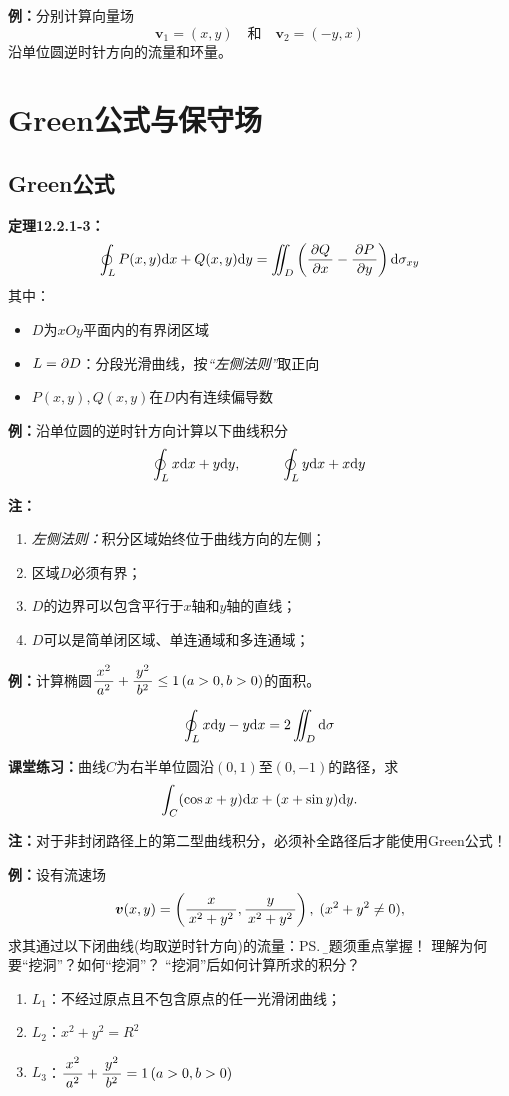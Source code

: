 {\bf 例：}分别计算向量场
$$\bm{v}_1=(x,y)\quad\mbox{和}\quad \bm{v}_2=(-y,x)$$
沿单位圆逆时针方向的流量和环量。

\section{Green公式与保守场}

\subsection{Green公式}

{\bf 定理12.2.1-3：}$$\oint_LP(x,y)\mathrm{d} x+Q(x,y)\mathrm{d} y=\iint_D\left(
\displaystyle\frac{\,{\partial Q}\,}{\,{\partial x}\,}-\displaystyle\frac{\,{\partial P}\,}{\,{\partial y}\,}\right)\mathrm{d}\sigma_{xy}$$
其中：
\begin{itemize}
  \setlength{\itemindent}{1cm}
  \item $D$为$xOy$平面内的有界闭区域
  \item $L=\partial D$：分段光滑曲线，按{\it “左侧法则”}取正向
  \item $P(x,y),Q(x,y)$在$D$内有连续偏导数
\end{itemize}

{\bf 例：}沿单位圆的逆时针方向计算以下曲线积分
$$\oint_Lx\mathrm{d} x+y\mathrm{d} y,\hspace{3em}\oint_Ly\mathrm{d} x+x\mathrm{d} y$$

{\bf 注：}
\begin{enumerate}[(1)]
  \setlength{\itemindent}{1cm}
  \item {\it 左侧法则：}积分区域始终位于曲线方向的左侧；
  \item 区域$D$必须有界；
  \item $D$的边界可以包含平行于$x$轴和$y$轴的直线；
  \item $D$可以是简单闭区域、单连通域和多连通域；
\end{enumerate}

{\bf 例：}计算椭圆$\displaystyle\frac{\,{x^2}\,}{\,{a^2}\,}+\displaystyle\frac{\,{y^2}\,}{\,{b^2}\,}\leq 1\,(a>0,b>0)$的面积。

$$\oint_L x\mathrm{d} y-y\mathrm{d} x=2\iint_D\mathrm{d}\sigma$$

{\bf 课堂练习：}曲线$C$为右半单位圆沿$(0,1)$至$(0,-1)$的路径，求
$$\int_C(\cos x+y)\mathrm{d} x+(x+\sin y)\mathrm{d} y.$$

{\bf 注：}对于非封闭路径上的第二型曲线积分，必须补全路径后才能使用Green公式！

{\bf 例：}设有流速场
$$\bm{v}(x,y)=\left(\displaystyle\frac{\,{x}\,}{\,{x^2+y^2}\,},
\displaystyle\frac{\,{y}\,}{\,{x^2+y^2}\,}\right),\;(x^2+y^2\ne 0),$$
求其通过以下闭曲线(均取逆时针方向)的流量：\ps{{\b 本题须重点掌握！}
理解为何要“挖洞”？如何“挖洞”？
“挖洞”后如何计算所求的积分？}
\begin{enumerate}[(1)]
  \setlength{\itemindent}{1cm}
  \item $L_1$：不经过原点且不包含原点的任一光滑闭曲线；
  \item $L_2$：$x^2+y^2=R^2$
  \item $L_3$：$\displaystyle\frac{\,{x^2}\,}{\,{a^2}\,}+\displaystyle\frac{\,{y^2}\,}{\,{b^2}\,}=1\,(a>0,b>0)$
\end{enumerate}

